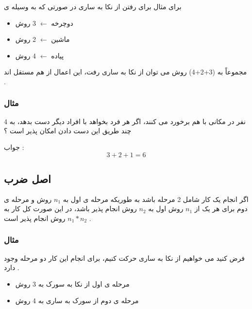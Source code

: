 \documentclass[12pt]{book}
\begin{document}
برای مثال برای رفتن از نکا به ساری در صورتی که به وسیله ی 

\begin{itemize}
	\item دوچرخه $\leftarrow$ 3 روش
	\item ماشین $\leftarrow$ 2 روش
	\item پیاده $\leftarrow$ 4 روش
\end{itemize}


مجموعاً به (3+2+4) روش می توان از نکا به ساری رفت، این اعمال از هم مستقل اند .


\subsubsection{مثال}

4 نفر در مکانی با هم برخورد می کنند، اگر هر فرد بخواهد با افراد دیگر دست بدهد، به چند طریق این دست دادن امکان پذیر است ؟



جواب : 
$$
3 + 2 + 1 = 6
$$


\subsection{اصل ضرب}

اگر انجام یک کار شامل 2 مرحله باشد به طوریکه مرحله ی اول به $n_{1}$ روش و مرحله ی دوم برای هر یک از $n_{1}$ روش اول به $n_{2}$ روش انجام پذیر باشد، در این صورت کل کار به $n_{1} * n_{2}$ روش انجام پذیر است .

\subsubsection{مثال}
فرض کنید می خواهیم از نکا به ساری حرکت کنیم، برای انجام این کار دو مرحله وجود دارد .
\begin{itemize}
	\item مرحله ی اول از نکا به سورک به 3 روش
	\item مرحله ی دوم از سورک به ساری به 4 روش
\end{itemize}
\end{document}
